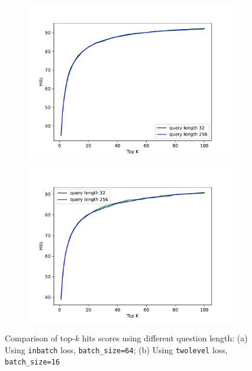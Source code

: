 \documentclass[12pt, sort&compress]{report}
\begin{document}
\begin{figure}[!htbp]
	\begin{subfigure}{.5\linewidth}
		\centering
		\includegraphics[scale=0.45]{images/PDF/experiments/inbatch_batch64.pdf}
		\caption{}
		\label{fig:19:a}
	\end{subfigure}
	\begin{subfigure}{.5\linewidth}
		\centering
		\includegraphics[scale=.45]{images/PDF/experiments/twolevel_batch16.pdf}
		\caption{}
		\label{fig:19:b}
	\end{subfigure}
	\caption{Comparison of top-$k$ hits scores using different question length: (a) Using {\tt inbatch} loss, {\tt batch\_size=64}; (b) Using {\tt twolevel} loss, {\tt batch\_size=16}}
	\label{fig:19}
\end{figure}
\end{document}
